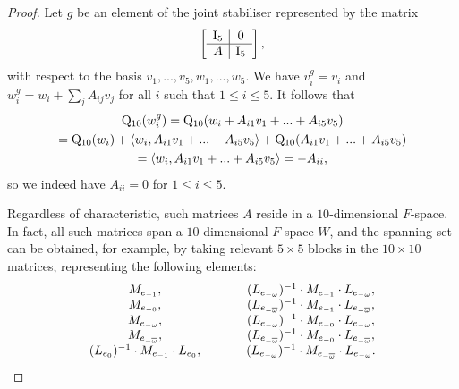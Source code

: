 \begin{proof}
Let $g$ be an element of the joint
stabiliser represented by the matrix
	\begin{equation*}
		\left[
			\begin{array}{c|c}
				\mathord{\mathrm{I}}_5 & 0 \\ \hline
				A & \mathord{\mathrm{I}}_5
			\end{array}
		\right],
	\end{equation*}
	with respect to the basis $v_1,...,v_5, w_1,...,w_5$. We have $v_i^g = v_i$ and $w_i^g = w_i + \sum_j A_{i j} v_j$ for all $i$ such that
	$1 \leqslant i \leqslant 5$. It follows that 
	\begin{multline*}
		\mathord{\mathrm{Q}}_{10}(w_i^g) = \mathord{\mathrm{Q}}_{10}(w_i + A_{i 1} v_1 + ... + A_{i 5} v_5) \\
		    =\mathord{\mathrm{Q}}_{10}(w_i) + \langle w_i, A_{i 1} v_1 + ... + A_{i 5} v_5 \rangle + \mathord{\mathrm{Q}}_{10}(A_{i 1} v_1 + ... + A_{i 5} v_5) \\
		    = \langle w_i, A_{i 1} v_1 + ... + A_{i 5} v_5 \rangle  = -A_{ii},
	\end{multline*}
	so we indeed have $A_{i i} = 0$ for $1 \leqslant i \leqslant 5$. 
	
	Regardless of characteristic, such matrices $A$ reside
	in a $10$-dimensional $F$-space. 
	In fact, all such matrices
	span a $10$-dimensional $F$-space $W$, and the spanning set
	can be obtained, for example, by taking relevant 
	$5 \times 5$ blocks in the $10 \times 10$ matrices, 
	representing the following elements:
\begin{equation*}
	\begin{array}{c@{\ \ \ \ \ \ \ \ \ \ \ }c}
M_{e_{-1}},&
	(L_{e_{-\omega}})^{-1}\cdot M_{e_{-1}}\cdot L_{e_{-\omega}}, \\

M_{e_{-0}},&
	(L_{e_{-\bar{\omega}}})^{-1}\cdot M_{e_{-1}}\cdot L_{e_{-\bar{\omega}}}, \\
	
M_{e_{-\omega}},&
	(L_{e_{-\omega}})^{-1}\cdot M_{e_{-0}}\cdot L_{e_{-\omega}}, \\
	
M_{e_{-\bar{\omega}}},&
	(L_{e_{-\bar{\omega}}})^{-1}\cdot M_{e_{-0}}\cdot L_{e_{-\bar{\omega}}}, \\
	

(L_{e_{0}})^{-1}\cdot M_{e_{-1}}\cdot L_{e_{0}}, &

(L_{e_{-\omega}})^{-1}\cdot M_{e_{-\bar{\omega}}}\cdot L_{e_{-\omega}}.
	\end{array}
\end{equation*}


\end{proof}
